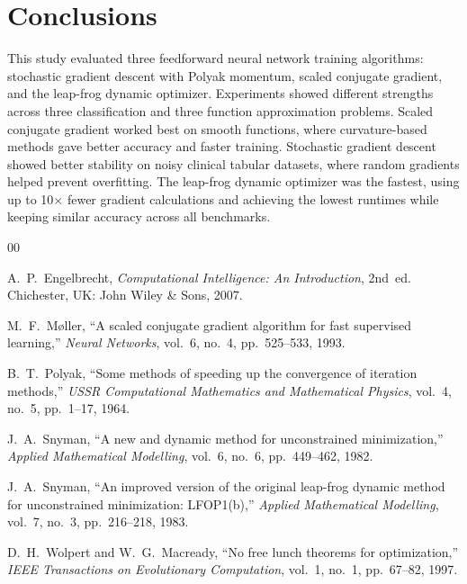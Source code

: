 \documentclass[conference,10pt]{IEEEtran}
\begin{document}
\newpage
\section{Conclusions}
This study evaluated three feedforward neural network training algorithms: stochastic gradient descent with Polyak momentum, scaled conjugate gradient, and the leap-frog dynamic optimizer. Experiments showed different strengths across three classification and three function approximation problems. Scaled conjugate gradient worked best on smooth functions, where curvature-based methods gave better accuracy and faster training. Stochastic gradient descent showed better stability on noisy clinical tabular datasets, where random gradients helped prevent overfitting. The leap-frog dynamic optimizer was the fastest, using up to 10$\times$ fewer gradient calculations and achieving the lowest runtimes while keeping similar accuracy across all benchmarks.

\begin{thebibliography}{00}
\setlength{\itemsep}{1.5pt}
\setlength{\parskip}{0pt}

A.~P.~Engelbrecht, \emph{Computational Intelligence: An Introduction}, 2nd~ed. Chichester, UK: John Wiley \& Sons, 2007.

M.~F.~M\o{}ller, ``A scaled conjugate gradient algorithm for fast supervised learning,'' \emph{Neural Networks}, vol.~6, no.~4, pp.~525--533, 1993.

B.~T.~Polyak, ``Some methods of speeding up the convergence of iteration methods,'' \emph{USSR Computational Mathematics and Mathematical Physics}, vol.~4, no.~5, pp.~1--17, 1964.

J.~A.~Snyman, ``A new and dynamic method for unconstrained minimization,'' \emph{Applied Mathematical Modelling}, vol.~6, no.~6, pp.~449--462, 1982.

J.~A.~Snyman, ``An improved version of the original leap-frog dynamic method for unconstrained minimization: LFOP1(b),'' \emph{Applied Mathematical Modelling}, vol.~7, no.~3, pp.~216--218, 1983.

D.~H.~Wolpert and W.~G.~Macready, ``No free lunch theorems for optimization,'' \emph{IEEE Transactions on Evolutionary Computation}, vol.~1, no.~1, pp.~67--82, 1997.

\end{thebibliography}
\end{document}
